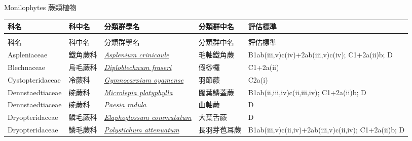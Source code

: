 \noindent\normalfont\selectfont Monilophytes 蕨類植物
\footnotesize\selectfont
        {\def\arraystretch{1.5}\tabcolsep=2pt
        \begin{longtable}{p{2.5cm}p{2.5cm}p{4.5cm}p{2.5cm}p{3cm}}
        \toprule
          科名 & 科中名 & 分類群學名 & 分類群中名 & 評估標準 \\
        \midrule 
        \endfirsthead

        \multicolumn{4}{l}{\bfseries\Large\color{red}{國家極危 (NCR) 類別維管束植物名錄(續)}} \\
        \toprule
        科名 & 科中名 & 分類群學名 & 分類群中名 & 評估標準 \\
        \midrule
        \endhead
                Aspleniaceae & 鐵角蕨科 & \href{http://www.theplantlist.org/tpl1.1/search?q=Asplenium+crinicaule}{\textit{Asplenium crinicaule} } & 毛軸鐵角蕨 & B1ab(iii,v)c(iv)+2ab(iii,v)c(iv); C1+2a(ii)b; D \index{Asplenium@\textit{Asplenium}!crinicaule@\textit{crinicaule}}  \index{毛軸鐵角蕨} \\
    Blechnaceae & 烏毛蕨科 & \href{http://www.theplantlist.org/tpl1.1/search?q=Diploblechnum+fraseri}{\textit{Diploblechnum fraseri} } & 假桫欏 & C1+2a(ii) \index{Diploblechnum@\textit{Diploblechnum}!fraseri@\textit{fraseri}}  \index{假桫欏} \\
    Cystopteridaceae & 冷蕨科 & \href{http://www.theplantlist.org/tpl1.1/search?q=Gymnocarpium+oyamense}{\textit{Gymnocarpium oyamense} } & 羽節蕨 & C2a(i) \index{Gymnocarpium@\textit{Gymnocarpium}!oyamense@\textit{oyamense}}  \index{羽節蕨} \\
    Dennstaedtiaceae & 碗蕨科 & \href{http://www.theplantlist.org/tpl1.1/search?q=Microlepia+platyphylla}{\textit{Microlepia platyphylla} } & 闊葉鱗蓋蕨 & B1ab(ii,iii,iv)c(ii,iii,iv); C1+2a(ii)b; D \index{Microlepia@\textit{Microlepia}!platyphylla@\textit{platyphylla}}  \index{闊葉鱗蓋蕨} \\
    Dennstaedtiaceae & 碗蕨科 & \href{http://www.theplantlist.org/tpl1.1/search?q=Paesia+radula}{\textit{Paesia radula} } & 曲軸蕨 & D \index{Paesia@\textit{Paesia}!radula@\textit{radula}}  \index{曲軸蕨} \\
    Dryopteridaceae & 鱗毛蕨科 & \href{http://www.theplantlist.org/tpl1.1/search?q=Elaphoglossum+commutatum}{\textit{Elaphoglossum commutatum} } & 大葉舌蕨 & D \index{Elaphoglossum@\textit{Elaphoglossum}!commutatum@\textit{commutatum}}  \index{大葉舌蕨} \\
    Dryopteridaceae & 鱗毛蕨科 & \href{http://www.theplantlist.org/tpl1.1/search?q=Polystichum+attenuatum}{\textit{Polystichum attenuatum} } & 長羽芽苞耳蕨 & B1ab(iii,v)c(ii,iv)+2ab(iii,v)c(ii,iv); C1+2a(ii)b; D \index{Polystichum@\textit{Polystichum}!attenuatum@\textit{attenuatum}}  \index{長羽芽苞耳蕨} \\

\end{longtable}}
